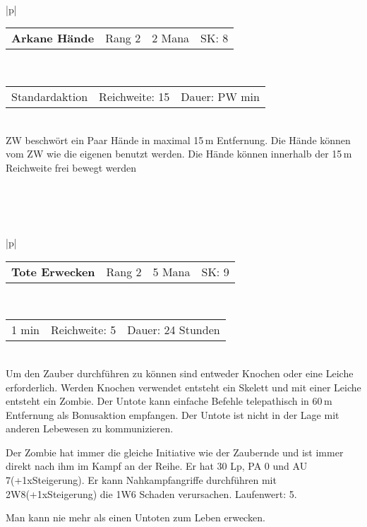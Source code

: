 \documentclass[../../Heldenanleitung2]{subfiles}
\begin{document}
\\\\\\
\begin{tabular}{|p{\textwidth}|}
\hline
\begin{tabularx}{\textwidth}{X|X|X|X}
\textbf{Arkane Hände} & Rang 2 & 2 Mana & SK: 8
\end{tabularx} \\ \hline
\begin{tabularx}{\textwidth}{X|X|X}
Standardaktion & Reichweite: 15 & Dauer: PW min
\end{tabularx} \\ \hline
ZW beschwört ein Paar Hände in maximal 15\,m Entfernung. Die Hände können vom ZW wie die eigenen benutzt werden. Die Hände können innerhalb der 15\,m Reichweite frei bewegt werden
\\ \hline
\end{tabular}
\\\\\\
\begin{tabular}{|p{\textwidth}|}
\hline
\begin{tabularx}{\textwidth}{X|X|X|X}
\textbf{Tote Erwecken} & Rang 2 & 5 Mana & SK: 9
\end{tabularx} \\ \hline
\begin{tabularx}{\textwidth}{X|X|X}
1 min & Reichweite: 5 & Dauer: 24 Stunden
\end{tabularx} \\ \hline
Um den Zauber durchführen zu können sind entweder Knochen oder eine Leiche erforderlich. Werden Knochen verwendet entsteht ein Skelett und mit einer Leiche entsteht ein Zombie. Der Untote kann einfache Befehle telepathisch in 60\,m Entfernung als Bonusaktion empfangen. Der Untote ist nicht in der Lage mit anderen Lebewesen zu kommunizieren.

Der Zombie hat immer die gleiche Initiative wie der Zaubernde und ist immer direkt nach ihm im Kampf an der Reihe. Er hat 30 Lp, PA 0 und AU 7(+1xSteigerung). Er kann Nahkampfangriffe durchführen mit 2W8(+1xSteigerung) die 1W6 Schaden verursachen. Laufenwert: 5.

Man kann nie mehr als einen Untoten zum Leben erwecken.
\\ \hline
\end{tabular}
\\\\\\
\end{document}
